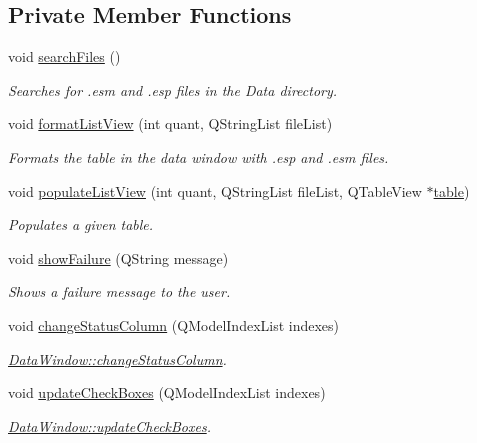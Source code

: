 \subsection*{Private Member Functions}
\begin{DoxyCompactItemize}
\item 
void \hyperlink{class_data_window_a688deef3093506b8d7889c19c3b3c65a}{search\+Files} ()
\begin{DoxyCompactList}\small\item\em Searches for .esm and .esp files in the Data directory. \end{DoxyCompactList}\item 
void \hyperlink{class_data_window_ae3d109b65fb7dfe89f182f26a71bcc44}{format\+List\+View} (int quant, Q\+String\+List file\+List)
\begin{DoxyCompactList}\small\item\em Formats the table in the data window with .esp and .esm files. \end{DoxyCompactList}\item 
void \hyperlink{class_data_window_a05f37e2adbb1f1d530b636065fe84a30}{populate\+List\+View} (int quant, Q\+String\+List file\+List, Q\+Table\+View $\ast$\hyperlink{class_data_window_ade51aa7748850fd9cef283dbb771b083}{table})
\begin{DoxyCompactList}\small\item\em Populates a given table. \end{DoxyCompactList}\item 
void \hyperlink{class_data_window_a211e1d08ef7eed73e2c7d815e5506479}{show\+Failure} (Q\+String message)
\begin{DoxyCompactList}\small\item\em Shows a failure message to the user. \end{DoxyCompactList}\item 
void \hyperlink{class_data_window_ace296e3143e2ab4db036b53bf6b969db}{change\+Status\+Column} (Q\+Model\+Index\+List indexes)
\begin{DoxyCompactList}\small\item\em \hyperlink{class_data_window_ace296e3143e2ab4db036b53bf6b969db}{Data\+Window\+::change\+Status\+Column}. \end{DoxyCompactList}\item 
void \hyperlink{class_data_window_a19d79c091d0b19d22eba8b21a7360cf5}{update\+Check\+Boxes} (Q\+Model\+Index\+List indexes)
\begin{DoxyCompactList}\small\item\em \hyperlink{class_data_window_a19d79c091d0b19d22eba8b21a7360cf5}{Data\+Window\+::update\+Check\+Boxes}. \end{DoxyCompactList}\end{DoxyCompactItemize}
